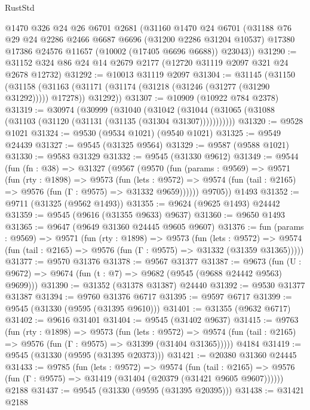 \begin{lexlean}{RustStd}
\begin{coremodule}
    @1470
    @326
    @24
    @26
    @6701
    @2681
    (@31160
      @1470
      @24
      @6701
      (@31188
        @76
        @29
        @24
        @2286
        @2466
        @6687
        @6696
        (@31200 @2286 @31204 @10537)
        @17380
        @17386
        @24576
        @11657
        (@10002 (@17405 @6696 @6688))
        @23043))
@31290 := @31152 @324 @86 @24 @14 @2679 @2177 (@12720 @31119 @2097 @321 @24 @2678 @12732)
@31292 := @10013 @31119 @2097
@31304 := @31145
    (@31150
      (@31158 (@31163 (@31171 (@31174 (@31218 (@31246 (@31277 (@31290 @31292))))) @17278)) @31292))
@31307 := @10909 (@10922 @784 @2378)
@31319 := @30974
    (@30999
      (@31040
        (@31042 (@31044 (@31065 (@31088 (@31103 (@31120 (@31131 (@31135 (@31304 @31307)))))))))))
@31320 := @9528 @1021
@31324 := @9530 (@9534 @1021) (@9540 @1021)
@31325 := @9549 @24439
@31327 := @9545 (@31325 @9564)
@31329 := @9587 (@9588 @1021)
@31330 := @9583 @31329
@31332 := @9545 (@31330 @9612)
@31349 := @9544
    (fun (fn : @38) =>
    @31327
      (@9567
        (@9570
          (fun (params : @9569) =>
          @9571
            (fun (rty : @1898) =>
            @9573
              (fun (lets : @9572) =>
              @9574 (fun (tail : @2165) => @9576 (fun (Γ : @9575) => @31332 @9659))))))
        @9705))
    @1493
@31352 := @9711 (@31325 (@9562 @1493))
@31355 := @9624 (@9625 @1493) @24442
@31359 := @9545 (@9616 (@31355 @9633) @9637)
@31360 := @9650 @1493
@31365 := @9647 (@9649 @31360 @24445 @9605 @9607)
@31376 := fun (params : @9569) =>
  @9571
    (fun (rty : @1898) =>
    @9573
      (fun (lets : @9572) =>
      @9574 (fun (tail : @2165) => @9576 (fun (Γ : @9575) => @31332 (@31359 @31365)))))
@31377 := @9570 @31376
@31378 := @9567 @31377
@31387 := @9673
    (fun (U : @9672) => @9674 (fun (t : @7) => @9682 (@9545 (@9688 @24442 @9563) @9699)))
@31390 := @31352 (@31378 @31387) @24440
@31392 := @9530 @31377 @31387
@31394 := @9760 @31376 @6717
@31395 := @9597 @6717
@31399 := @9545 (@31330 (@9595 (@31395 @9610)))
@31401 := @31355 (@9632 @6717)
@31402 := @9616 @31401
@31404 := @9545 (@31402 @9637)
@31415 := @9763
    (fun (rty : @1898) =>
    @9573
      (fun (lets : @9572) =>
      @9574 (fun (tail : @2165) => @9576 (fun (Γ : @9575) => @31399 (@31404 @31365)))))
    @4184
@31419 := @9545 (@31330 (@9595 (@31395 @20373)))
@31421 := @20380 @31360 @24445
@31433 := @9785
    (fun (lets : @9572) =>
    @9574
      (fun (tail : @2165) =>
      @9576 (fun (Γ : @9575) => @31419 (@31404 (@20379 (@31421 @9605 @9607))))))
    @2188
@31437 := @9545 (@31330 (@9595 (@31395 @20395)))
@31438 := @31421 @2188

\end{coremodule}
\end{lexlean}
